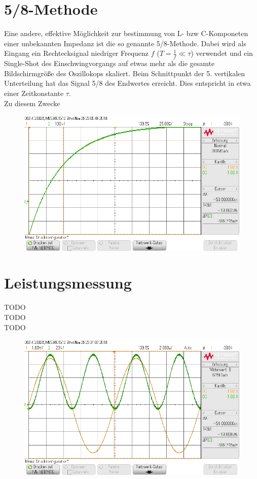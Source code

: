 \section{5/8-Methode}
Eine andere, effektive Möglichkeit zur bestimmung von L- bzw C-Komponeten einer unbekannten Impedanz ist die so genannte 5/8-Methode. Dabei wird als Eingang ein Rechtecksignal niedriger Frequenz $f$ ($T = \frac{1}{f} \ll \tau$) verwendet und ein Single-Shot des Einschwingvorgangs auf etwas mehr als die gesamte Bildschirmgröße des Oszillokops skaliert. Beim Schnittpunkt der 5. vertikalen Unterteilung hat das Signal 5/8 des Endwertes erreicht. Dies entspricht in etwa einer Zeitkonstante $\tau$. \\
Zu diesem Zwecke 
\begin{figure}[H]
	\includegraphics[width=\textwidth]{./img/ch2/58_methode.png}
	\centering
	\label{Einschwingvorgangs des LR-Strangs}
\end{figure}

\section{Leistungsmessung}
TODO \\
TODO \\
TODO \\
\begin{figure}[H]
	\includegraphics[width=\textwidth]{./img/ch2/leistung.png}
	\centering
	\label{XXXXX}
\end{figure}